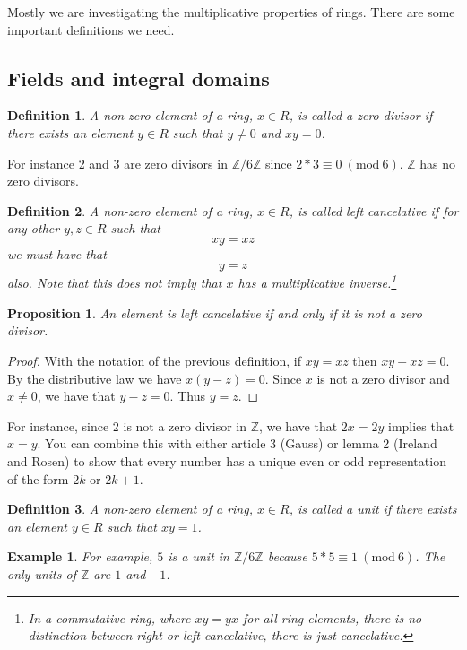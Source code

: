 \documentclass{article}
\theoremstyle{problemstyle}
\newtheorem{example}{Example}
\newtheorem{proposition}{Proposition}
\newtheorem{definition}{Definition}
\newcommand{\Mod}[1]{\ (\mathrm{mod}\ #1)}
\begin{document}
Mostly we are investigating the multiplicative properties of rings. There are some important definitions we need. 

\subsection*{Fields and integral domains}

\begin{definition}
A non-zero element of a ring, $x \in R$, is called a zero divisor if there exists an element $y \in R$ such that $y \neq 0$ and $xy = 0$. 
\end{definition}

For instance 2 and 3 are zero divisors in $\mathbb{Z}/6\mathbb{Z}$ since $2*3 \equiv 0 \Mod{6}$. $\mathbb{Z}$ has no zero divisors. 

\begin{definition}
A non-zero element of a ring, $x \in R$, is called left cancelative if for any other  $y,z \in R$ such that $$xy = xz$$ we must have that $$y = z$$ also. Note that this does not imply that $x$ has a multiplicative inverse.\footnote{In a commutative ring, where $xy = yx$ for all ring elements, there is no distinction between right or left cancelative, there is just cancelative.}
\end{definition}

\begin{proposition}
An element is left cancelative if and only if it is not a zero divisor. 
\end{proposition}

\begin{proof}
With the notation of the previous definition, if $xy = xz$ then $xy-xz=0$. By the distributive law we have $x(y-z) = 0$. Since $x$ is not a zero divisor and $x \neq 0$, we have that $y - z = 0$. Thus $y = z$. 
\end{proof}

For instance, since $2$ is not a zero divisor in $\mathbb{Z}$, we have that $2x = 2y$ implies that $x = y$. You can combine this with either article 3 (Gauss) or lemma 2 (Ireland and Rosen) to show that every number has a unique even or odd representation of the form $2k$ or $2k+1$. 

\begin{definition}
A non-zero element of a ring, $x \in R$, is called a unit if there exists an element $y \in R$ such that $xy = 1$. 
\end{definition}

\begin{example}
For example, $5$ is a unit in $\mathbb{Z}/6\mathbb{Z}$ because $5*5 \equiv 1 \Mod{6}$. The only units of $\mathbb{Z}$ are $1$ and $-1$. 
\end{example}
\end{document}
